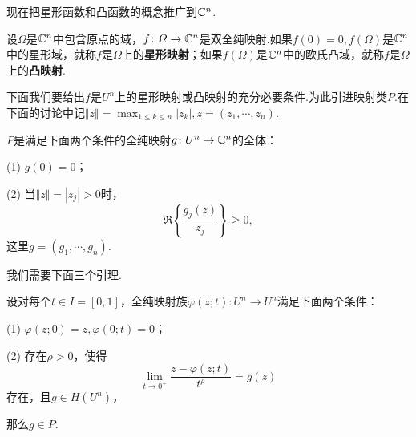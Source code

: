 现在把星形函数和凸函数的概念推广到$\mathbb C^n$.
\begin{definition}\label{def2.5.1}
	设$\Omega$是$\mathbb C^n$中包含原点的域，$f\colon\varOmega\to\mathbb C^n$是双全纯映射.如果$f(0)=0,f(\Omega)$是$\mathbb C^n$中的星形域，就称$f$是$\Omega$上的\textbf{星形映射}；如果$f(\Omega)$是$\mathbb C^n$中的欧氏凸域，就称$f$是$\Omega$上的\textbf{凸映射}.
\end{definition}
下面我们要给出$f$是$U^n$上的星形映射或凸映射的充分必要条件.为此引进映射类$P$.在下面的讨论中记$\Vert z\Vert=\max_{1\le k\le n} |z_k|,z=(z_1,\cdots,z_n)$.
\begin{definition}\label{def2.5.2}
	$P$是满足下面两个条件的全纯映射$g\colon U^n\to\mathbb C^n$的全体：
	
	(1)\hypertarget{2.5.2}{}
	$g(0)=0$；
	
	(2)\hypertarget{2.5.2}{}
	当$\Vert z\Vert=|z_j|>0$时，
	\[\Re\left\{\frac{g_j(z)}{z_j}\right\}\ge0,\]
	这里$g=(g_1,\cdots,g_n)$.
\end{definition}
我们需要下面三个引理.
\begin{lemma}\label{lem2.5.3}
	设对每个$t\in I=[0,1]$，全纯映射族$\varphi(z;t)\colon U^n\to U^n$满足下面两个条件：
	
	(1)\hypertarget{2.5.3}{}
	$\varphi(z;0)=z,\varphi(0;t)=0$；
	
	(2)\hypertarget{2.5.3}{}
	存在$\rho>0$，使得
	\begin{equation}\label{eq2.5.1}
		\lim_{t\to 0^+ } \frac{z-\varphi(z;t)}{t^\rho}=g(z)
	\end{equation}
存在，且$g\in H(U^n)$，

    那么\quad$g\in P$.
\end{lemma}
